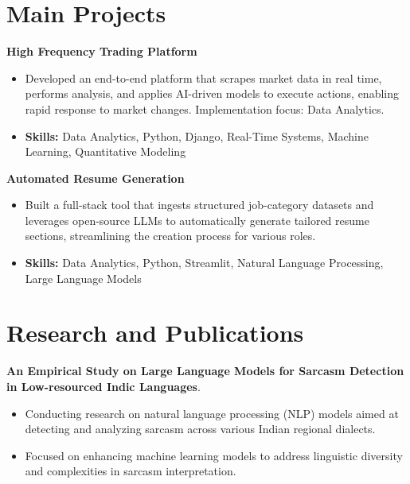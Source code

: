\documentclass[a4paper,11pt]{article}
\begin{document}
\section{\textbf{Main Projects}}

\vspace{1mm}
  \textbf{High Frequency Trading Platform  }
\vspace{-1.5mm} %
\begin{itemize}
  \item Developed an end-to-end platform that scrapes market data in real time, performs analysis, and applies AI-driven models to execute actions, enabling rapid response to market changes. Implementation focus: Data Analytics.
\vspace{-3mm}
  \item \textbf{Skills:} Data Analytics, Python, Django, Real-Time Systems, Machine Learning, Quantitative Modeling
\end{itemize}


\vspace{1mm}
   \textbf{Automated Resume Generation }
\vspace{-1.5mm} %
\begin{itemize}
  \item Built a full-stack tool that ingests structured job-category datasets and leverages open-source LLMs to automatically generate tailored resume sections, streamlining the creation process for various roles.
\vspace{-3mm}
  \item \textbf{Skills:} Data Analytics, Python, Streamlit, Natural Language Processing, Large Language Models
\end{itemize}



\section{\textbf{Research and Publications} \hfill }
\vspace{1mm}
  \textbf{An Empirical Study on Large Language Models for Sarcasm Detection in Low-resourced Indic Languages}.
\vspace{-1mm} %
\begin{itemize}
  \item Conducting research on natural language processing (NLP) models aimed at detecting and analyzing sarcasm across various Indian regional dialects.
\vspace{-3mm}
  \item Focused on enhancing machine learning models to address linguistic diversity and complexities in sarcasm interpretation.
\end{itemize}
\end{document}
